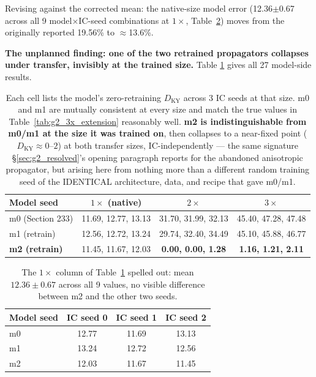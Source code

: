 \documentclass[11pt]{article}
\begin{document}
Revising against the corrected mean: the native-size model error
(12.36$\pm$0.67 across all 9 model$\times$IC-seed combinations at
$1\times$, Table~\ref{tab:t1_model_1x}) moves from the originally
reported 19.56\% to $\approx$13.6\%.

\textbf{The unplanned finding: one of the two retrained propagators
collapses under transfer, invisibly at the trained size.} Table
\ref{tab:t1_model_collapse} gives all 27 model-side results.

\begin{table}[h]
\centering
\begin{tabular}{lccc}
\toprule
Model seed & $1\times$ (native) & $2\times$ & $3\times$ \\
\midrule
m0 (Section 233) & 11.69, 12.77, 13.13 & 31.70, 31.99, 32.13 & 45.40, 47.28, 47.48 \\
m1 (retrain) & 12.56, 12.72, 13.24 & 29.74, 32.40, 34.49 & 45.10, 45.88, 46.77 \\
\textbf{m2 (retrain)} & 11.45, 11.67, 12.03 & \textbf{0.00, 0.00, 1.28} & \textbf{1.16, 1.21, 2.11} \\
\bottomrule
\end{tabular}
\caption{Each cell lists the model's zero-retraining $D_{\mathrm{KY}}$
across 3 IC seeds at that size. m0 and m1 are mutually consistent at
every size and match the true values in Table~\ref{tab:g2_3x_extension}
reasonably well. \textbf{m2 is indistinguishable from m0/m1 at the size
it was trained on}, then collapses to a near-fixed point
($D_{\mathrm{KY}}\approx0$--$2$) at both transfer sizes, IC-independently
--- the same signature \S\ref{sec:g2_resolved}'s opening paragraph
reports for the abandoned anisotropic propagator, but arising here from
nothing more than a different random training seed of the IDENTICAL
architecture, data, and recipe that gave m0/m1.}
\label{tab:t1_model_collapse}
\end{table}

\begin{table}[h]
\centering
\begin{tabular}{lccc}
\toprule
Model seed & IC seed 0 & IC seed 1 & IC seed 2 \\
\midrule
m0 & 12.77 & 11.69 & 13.13 \\
m1 & 13.24 & 12.72 & 12.56 \\
m2 & 12.03 & 11.67 & 11.45 \\
\bottomrule
\end{tabular}
\caption{The $1\times$ column of Table~\ref{tab:t1_model_collapse}
spelled out: mean $12.36\pm0.67$ across all 9 values, no visible
difference between m2 and the other two seeds.}
\label{tab:t1_model_1x}
\end{table}
\end{document}
